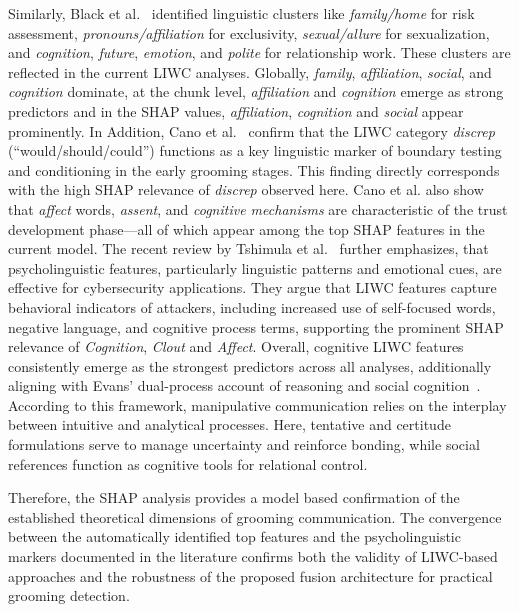 Similarly, Black et al.~\cite{black2015linguistic} identified linguistic clusters like \textit{family/home} for risk assessment, \textit{pronouns/affiliation} for exclusivity, \textit{sexual/allure} for sexualization, and \textit{cognition}, \textit{future}, \textit{emotion}, and \textit{polite} for relationship work. These clusters are reflected in the current LIWC analyses. Globally, \textit{family}, \textit{affiliation}, \textit{social}, and \textit{cognition} dominate, at the chunk level, \textit{affiliation} and \textit{cognition} emerge as strong predictors  and in the SHAP values, \textit{affiliation}, \textit{cognition} and \textit{social} appear prominently. In Addition, Cano et al.~\cite{Cano2014} confirm that the LIWC category \textit{discrep} (``would/should/could'') functions as a key linguistic marker of boundary testing and conditioning in the early grooming stages. This finding directly corresponds with the high SHAP relevance of \textit{discrep} observed here. Cano et al. also show that \textit{affect} words, \textit{assent}, and \textit{cognitive mechanisms} are characteristic of the trust development phase—all of which appear among the top SHAP features in the current model. The recent review by Tshimula et al.~\cite{tshimula2024psychologicalprofilingcybersecuritylook} further emphasizes, that psycholinguistic features, particularly linguistic patterns and emotional cues, are effective for cybersecurity applications. They argue that LIWC features capture behavioral indicators of attackers, including increased use of self-focused words, negative language, and cognitive process terms, supporting the prominent SHAP relevance of \textit{Cognition}, \textit{Clout} and \textit{Affect}. Overall, cognitive LIWC features consistently emerge as the strongest predictors across all analyses, additionally aligning with Evans’ dual-process account of reasoning and social cognition~\cite{evans2025corpus}. According to this framework, manipulative communication relies on the interplay between intuitive and analytical processes. Here, tentative and certitude formulations serve to manage uncertainty and reinforce bonding, while social references function as cognitive tools for relational control.

Therefore, the SHAP analysis provides a model based confirmation of the established theoretical dimensions of grooming communication. The convergence between the automatically identified top features and the psycholinguistic markers documented in the literature confirms both the validity of LIWC-based approaches and the robustness of the proposed fusion architecture for practical grooming detection.

